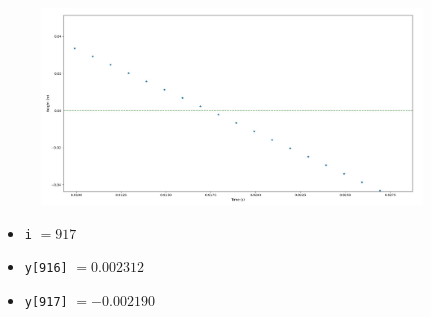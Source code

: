 \documentclass[english,14pt]{beamer}
\begin{document}
\begin{frame}[fragile]

\frametitle{}

\begin{figure}[ht]
	\centering
	\includegraphics[width=0.9\textwidth]{figures/LLp66ZoomOutput}
\end{figure}
\vspace*{-5mm}
\begin{itemize}
	\item \texttt{i} $= 917$
	\item \texttt{y[916]} $= 0.002312$
	\item \texttt{y[917]} $= -0.002190$
\end{itemize}

\end{frame}

\end{document}
